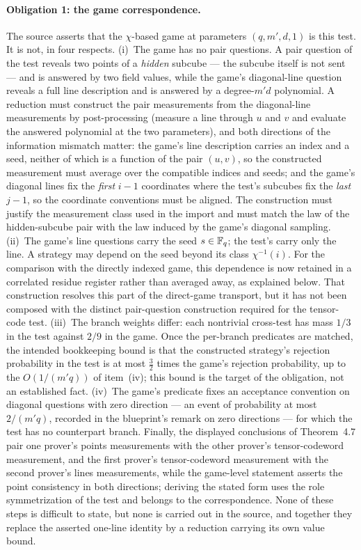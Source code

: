 \documentclass[11pt]{article}
\begin{document}
\paragraph{Obligation 1: the game correspondence.}
The source asserts that the $\chi$-based game at parameters $(q,m',d,1)$
is this test.  It is not, in four respects.
(i)~The game has no pair questions.  A pair question of the test reveals
two points of a \emph{hidden} subcube --- the subcube itself is not sent
--- and is answered by two field values, while the game's diagonal-line
question reveals a full line description and is answered by a degree-$m'd$
polynomial.  A reduction must construct the pair measurements from the
diagonal-line measurements by post-processing (measure a line through $u$
and $v$ and evaluate the answered polynomial at the two parameters), and
both directions of the information mismatch matter: the game's line
description carries an index and a seed, neither of which is a function of
the pair $(u,v)$, so the constructed measurement must average over the
compatible indices and seeds; and the game's diagonal lines fix the
\emph{first} $i-1$ coordinates where the test's subcubes fix the
\emph{last} $j-1$, so the coordinate conventions must be aligned.  The
construction must justify the measurement class used in the import and must
match the law of the hidden-subcube pair with the law induced by the game's
diagonal sampling.
(ii)~The game's line questions carry the seed $s \in \mathbb{F}_q$; the test's carry
only the line.  A strategy may depend on the seed beyond its class
$\chi^{-1}(i)$.  For the comparison with the directly indexed game, this
dependence is now retained in a correlated residue register rather than
averaged away, as explained below.  That construction resolves this part of
the direct-game transport, but it has not been composed with the distinct
pair-question construction required for the tensor-code test.
(iii)~The branch weights differ: each nontrivial cross-test has mass $1/3$
in the test against $2/9$ in the game.  Once the per-branch predicates are
matched, the intended bookkeeping bound is that the constructed strategy's
rejection probability in the test is at most $\tfrac32$ times the game's
rejection probability, up to the $O(1/(m'q))$ of item~(iv); this bound is
the target of the obligation, not an established fact.
(iv)~The game's predicate fixes an acceptance convention on diagonal
questions with zero direction --- an event of probability at most
$2/(m'q)$, recorded in the blueprint's remark on zero directions --- for
which the test has no counterpart branch.
Finally, the displayed conclusions of Theorem~4.7 pair one prover's points
measurements with the other prover's tensor-codeword measurement, and the
first prover's tensor-codeword measurement with the second prover's lines
measurements, while the game-level statement asserts the point consistency
in both directions; deriving the stated form uses the role symmetrization
of the test and belongs to the correspondence.  None of these steps is
difficult to state, but none is carried out in the source, and together
they replace the asserted one-line identity by a reduction carrying its
own value bound.
\end{document}
